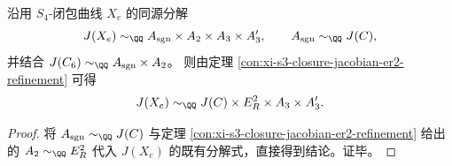 \begin{corollary}\label{cor:xi-s4-jacobian-er2-elliptification}
沿用 \(S_4\)-闭包曲线 \(X_e\) 的同源分解
\[
J(X_e)\sim_{\QQ}A_{\mathrm{sgn}}\times A_2\times A_3\times A_3',
\qquad
A_{\mathrm{sgn}}\sim_{\QQ}J(C),
\]
并结合 \(J(C_6)\sim_{\QQ}A_{\mathrm{sgn}}\times A_2\)。
则由定理 \ref{con:xi-s3-closure-jacobian-er2-refinement} 可得
\[
J(X_e)\sim_{\QQ}J(C)\times E_R^2\times A_3\times A_3'.
\]
\end{corollary}
\begin{proof}
将 \(A_{\mathrm{sgn}}\sim_{\QQ}J(C)\) 与定理 \ref{con:xi-s3-closure-jacobian-er2-refinement} 给出的
\(
A_2\sim_{\QQ}E_R^2
\)
代入 \(J(X_e)\) 的既有分解式，直接得到结论。证毕。
\end{proof}







\endinput
